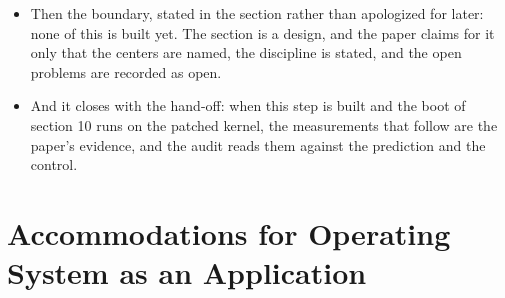 \documentclass[11pt]{article}
\begin{document}
\begin{itemize}
\item Then the boundary, stated in the section rather than apologized for later: none of this is built yet. The section is a design, and the paper claims for it only that the centers are named, the discipline is stated, and the open problems are recorded as open.
\item And it closes with the hand-off: when this step is built and the boot of section 10 runs on the patched kernel, the measurements that follow are the paper's evidence, and the audit reads them against the prediction and the control.
\end{itemize}

\section{Accommodations for Operating System as an Application}
\end{document}
